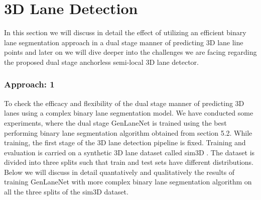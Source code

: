     \section{3D Lane Detection}
    In this section we will discuss in detail the effect of utilizing an efficient binary lane segmentation approach in a dual stage manner of predicting 3D lane line points and later on we will dive deeper into the challenges we are facing regarding the proposed dual stage anchorless semi-local 3D lane detector.  
    \subsubsection{Approach: 1}
    To check the efficacy and flexibility of the dual stage manner of predicting 3D lanes using a complex binary lane segmentation model. We have conducted some experiments, where the dual stage GenLaneNet \cite{guo2020gen} is trained  using the best performing binary lane segmentation algorithm obtained from section 5.2. 
    While training, the first stage of the 3D lane detection pipeline is fixed. Training and evaluation is carried on a synthetic 3D lane dataset called sim3D \cite{}. The dataset is divided into three splits such that train and test sets have different distributions. Below we will discuss in detail quantatively and qualitatively the results of training GenLaneNet with more complex binary lane segmentation algorithm on all the three splits of the sim3D dataset.
 

